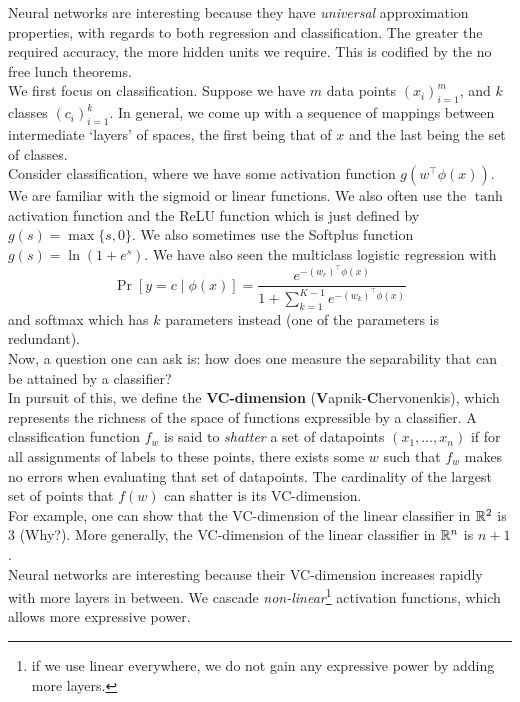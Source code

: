 \documentclass{article}
\begin{document}
		Neural networks are interesting because they have \emph{universal} approximation properties, with regards to both regression and classification. The greater the required accuracy, the more hidden units we require. This is codified by the no free lunch theorems.\\

		We first focus on classification. Suppose we have $m$ data points $(x_i)_{i=1}^m$, and $k$ classes $(c_i)_{i=1}^k$. In general, we come up with a sequence of mappings between intermediate `layers' of spaces, the first being that of $x$ and the last being the set of classes.\\
		Consider classification, where we have some activation function $g(w^\top\phi(x))$. We are familiar with the sigmoid or linear functions. We also often use the $\tanh$ activation function and the ReLU function which is just defined by $g(s) = \max\{s,0\}$. We also sometimes use the Softplus function $g(s) = \ln(1+e^s)$. We have also seen the multiclass logistic regression with
		\[ \Pr[y = c \mid \phi(x)] = \frac{e^{-(w_c)^\top\phi(x)}}{1 + \sum_{k=1}^{K-1} e^{-(w_k)^\top\phi(x)}} \]
		and softmax which has $k$ parameters instead (one of the parameters is redundant).\\

		Now, a question one can ask is: how does one measure the separability that can be attained by a classifier?\\
		In pursuit of this, we define the \textbf{VC-dimension} (\textbf{V}apnik-\textbf{C}hervonenkis), which represents the richness of the space of functions expressible by a classifier. A classification function $f_w$ is said to \emph{shatter} a set of datapoints $(x_1,\ldots,x_n)$ if for all assignments of labels to these points, there exists some $w$ such that $f_w$ makes no errors when evaluating that set of datapoints. The cardinality of the largest set of points that $f(w)$ can shatter is its VC-dimension.\\
		For example, one can show that the VC-dimension of the linear classifier in $\mathbb{R}^2$ is $3$ (Why?). More generally, the VC-dimension of the linear classifier in $\mathbb{R}^n$ is $n+1$.\\

		Neural networks are interesting because their VC-dimension increases rapidly with more layers in between. We cascade \emph{non-linear}\footnote{if we use linear everywhere, we do not gain any expressive power by adding more layers.} activation functions, which allows more expressive power.
\end{document}
